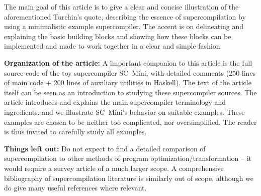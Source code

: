 The main goal of this article is to give a clear and concise illustration of the
aforementioned Turchin's quote, describing the essence of supercompilation
by using a minimalistic example supercompiler.
The accent is on delineating and explaining the basic building blocks
and showing how these blocks can be implemented and made to work together
in a clear and simple fashion.

\textbf{Organization of the article:}
A important companion to this article is the full source code of the toy supercompiler
SC~Mini, with detailed comments \cite{SCMiniUrl}
(250 lines of main code + 200 lines of auxiliary utilities in Haskell).
The text of the article itself can be seen as an introduction to studying
these supercompiler sources.
The article introduces and explains the main supercompiler terminology and ingredients,
and we illustrate SC~Mini's behavior on suitable examples.
These examples are chosen to be neither too complicated, nor oversimplified.
The reader is thus invited to carefully study all examples.


\textbf{Things left out:} 
Do not expect to find a detailed comparison of supercompilation to other methods
of program optimization/transformation -- it would require a survey article
of a much larger scope. 
A comprehensive bibliography of supercompilation literature is similarly out of scope,
although we do give many useful references where relevant.

